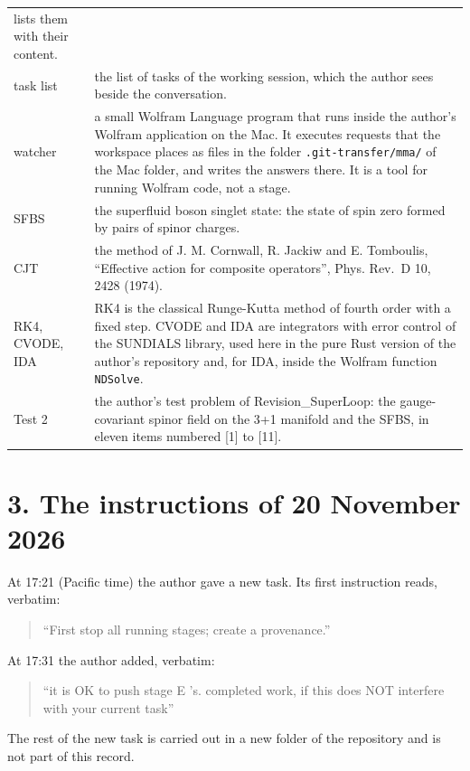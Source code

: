\documentclass[
  10pt,
]{article}
\begin{document}
\begin{longtable}[]{@{}
  >{\raggedright\arraybackslash}p{}
  >{\raggedright\arraybackslash}p{}@{}}
lists them with their content. \\
task list & the list of tasks of the working session, which the author
sees beside the conversation. \\
watcher & a small Wolfram Language program that runs inside the author's
Wolfram application on the Mac. It executes requests that the workspace
places as files in the folder \texttt{.git-transfer/mma/} of the Mac
folder, and writes the answers there. It is a tool for running Wolfram
code, not a stage. \\
SFBS & the superfluid boson singlet state: the state of spin zero formed
by pairs of spinor charges. \\
CJT & the method of J. M. Cornwall, R. Jackiw and E. Tomboulis,
``Effective action for composite operators'', Phys. Rev.~D 10, 2428
(1974). \\
RK4, CVODE, IDA & RK4 is the classical Runge-Kutta method of fourth
order with a fixed step. CVODE and IDA are integrators with error
control of the SUNDIALS library, used here in the pure Rust version of
the author's repository and, for IDA, inside the Wolfram function
\texttt{NDSolve}. \\
Test 2 & the author's test problem of Revision\_SuperLoop: the
gauge-covariant spinor field on the 3+1 manifold and the SFBS, in eleven
items numbered {[}1{]} to {[}11{]}. \\
\end{longtable}

\hypertarget{the-instructions-of-20-november-2026}{%
\section{3. The instructions of 20 November
2026}\label{the-instructions-of-20-november-2026}}

At 17:21 (Pacific time) the author gave a new task. Its first
instruction reads, verbatim:

\begin{quote}
``First stop all running stages; create a provenance.''
\end{quote}

At 17:31 the author added, verbatim:

\begin{quote}
``it is OK to push stage E 's. completed work, if this does NOT
interfere with your current task''
\end{quote}

The rest of the new task is carried out in a new folder of the
repository and is not part of this record.
\end{document}
